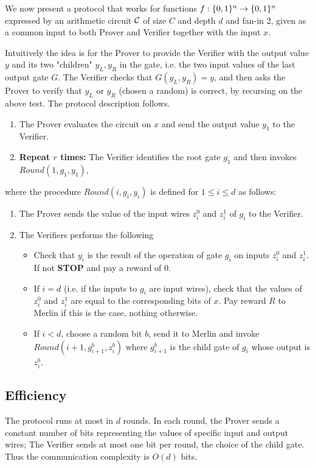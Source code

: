 \label{sec:our-protocol}

We now present a protocol that works for functions $f: \{0, 1\}^n \to \{0, 1\}^n$ expressed by an arithmetic circuit $\cal C$ of size $C$ and depth $d$ and fan-in 2, given as a common input to both Prover and Verifier together with the input $x$. 

Intuitively the idea is for the Prover to provide the Verifier with the output value $y$ and its two "children" $y_L,y_R$ in the gate, i.e. the two input values of the last output gate $G$. The Verifier checks that $G(y_L,y_R)=y$, and then asks the Prover to verify that $y_L$ or $y_R$ (chosen a random) is correct, by 
recursing on the above test. The protocol description follows. 

\smallskip
\noindent

\begin{enumerate}
\item The Prover evaluates the circuit on $x$ and send the output value $y_1$ to the
Verifier. 

\item {\bf Repeat $r$ times:} The Verifier identifies the root gate $g_1$ and 
then invokes $Round(1,g_1, y_1)$,
\end{enumerate}
where the procedure $Round(i, g_i, y_i)$ is defined for $1 \leq i \leq d$ as 
follows:
\begin{enumerate}
\item The Prover sends the value of the input wires $z^0_i$ and $z^1_i$ of $g_i$ to the Verifier.  

\item The Verifiers performs the following 
\begin{itemize}
\item Check that $y_i$ is the result of the operation of gate $g_i$ on inputs 
$z^0_i$ and $z^1_i$. If not \textbf{STOP} and pay a reward of $0$.
\item If $i = d$ (i.e. if the inputs to $g_i$ are input wires), check that 
the values of $z^0_i$ and $z^1_i$ are equal to the corresponding bits of $x$. Pay
reward $R$ to Merlin if this is the case, nothing otherwise.
\item If $i < d$, choose a random bit $b$, send it to Merlin and invoke 
$Round(i+1, g^b_{i+1}, z^b_i)$ where $g^b_{i+1}$ is the child gate of $g_i$ whose output is
$z^b_{i}$.
\end{itemize}
\end{enumerate}


\subsection{Efficiency} 
The protocol runs at most in $d$ rounds.
In each round, the Prover sends a constant number of bits representing the values 
of specific input and output wires; The Verifier sends at most one bit per round, 
the choice of the child gate. Thus the communication complexity is $O(d)$ bits.

